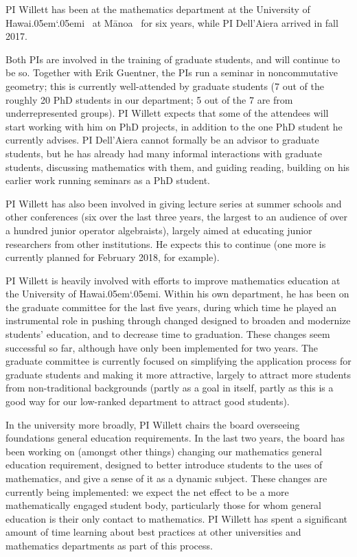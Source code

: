 \documentclass[11pt]{article}
\newcommand{\Manoa}{M\=anoa}
\newcommand{\Hawaii}{Hawai\kern.05em`\kern.05em\relax i}
\theoremstyle{plain}
\theoremstyle{definition}
\theoremstyle{remark}
\begin{document}
 
PI Willett has been at the mathematics department at the University of \Hawaii~ at \Manoa~ for six years, while PI Dell'Aiera arrived in fall 2017.  

Both PIs are involved in the training of graduate students, and will continue to be so.  Together with Erik Guentner, the PIs run a seminar in noncommutative geometry; this is currently well-attended by graduate students (7 out of the roughly 20 PhD students in our department; 5 out of the 7 are from underrepresented groups).  PI Willett expects that some of the attendees will start working with him on PhD projects, in addition to the one PhD student he currently advises.  PI Dell'Aiera cannot formally be an advisor to graduate students, but he has already had many informal interactions with graduate students, discussing mathematics with them, and guiding reading, building on his earlier work running seminars as a PhD student.

PI Willett has also been involved in giving lecture series at summer schools and other conferences (six over the last three years, the largest to an audience of over a hundred junior operator algebraists), largely aimed at educating junior researchers from other institutions.  He expects this to continue (one more is currently planned for February 2018, for example).  

PI Willett is heavily involved with efforts to improve mathematics education at the University of \Hawaii.  Within his own department, he has been on the graduate committee for the last five years, during which time he played an instrumental role in pushing through changed designed to broaden and modernize students' education, and to decrease time to graduation.  These changes seem successful so far, although have only been implemented for two years.  The graduate committee is currently focused on simplifying the application process for graduate students and making it more attractive, largely to attract more students from non-traditional backgrounds (partly as a goal in itself, partly as this is a good way for our low-ranked department to attract good students).

In the university more broadly, PI Willett chairs the board overseeing foundations general education requirements.  In the last two years, the board has been working on (amongst other things) changing our mathematics general education requirement, designed to better introduce students to the uses of mathematics, and give a sense of it as a dynamic subject.  These changes are currently being implemented: we expect the net effect to be a more mathematically engaged student body, particularly those for whom general education is their only contact to mathematics.  PI Willett has spent a significant amount of time learning about best practices at other universities and mathematics departments as part of this process.  
\end{document}
